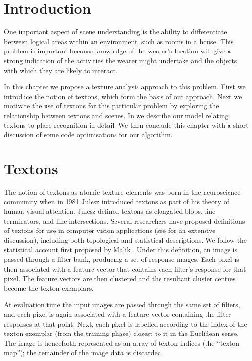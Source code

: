 \section{Introduction}
One important aspect of scene understanding is the ability to
differentiate between logical areas within an environment, such as
rooms in a house. This problem is important because knowledge of the
wearer's location will give a strong indication of the activities the
wearer might undertake and the objects with which they are likely to
interact.

In this chapter we propose a texture analysis approach to this
problem. First we introduce the notion of textons, which form the
basis of our approach. Next we motivate the use of textons for this
particular problem by exploring the relationship between textons and
scenes. In  we describe our model relating textons
to place recognition in detail. We then conclude this chapter with a
short discussion of some code optimisations for our algorithm.

\section{Textons}
The notion of textons as atomic texture elements was born in the
neuroscience community when in 1981 Julesz \cite{Julesz81} introduced
textons as part of his theory of human visual attention. Julesz
defined textons as elongated blobs, line terminators, and line
intersections. Several researchers have proposed definitions of
textons for use in computer vision applications (see \cite{Zhu02} for
an extensive discussion), including both topological and statistical
descriptions. We follow the statistical account first proposed by
Malik \etal \cite{Malik99}. Under this definition, an image is passed
through a filter bank, producing a set of response images. Each pixel
is then associated with a feature vector that contains each filter's
response for that pixel. The feature vectors are then clustered and
the resultant cluster centres become the texton exemplars.

At evaluation time the input images are passed through the same set of
filters, and each pixel is again associated with a feature vector
containing the filter responses at that point. Next, each pixel is
labelled according to the index of the texton exemplar (from the
training phase) closest to it in the Euclidean sense. The image is
henceforth represented as an array of texton indices (the ``texton
map''); the remainder of the image data is discarded.

